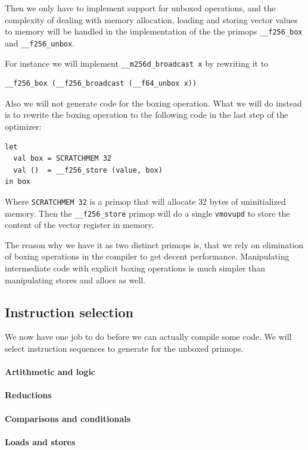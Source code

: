 \documentclass{article}
\begin{document}
Then we only have to implement support for unboxed operations, and the complexity of dealing with memory allocation, loading and storing vector values to memory will be handled in the implementation of the the primops \verb!__f256_box! and \verb!__f256_unbox!.

For instance we will implement \verb!__m256d_broadcast x! by rewriting it to
\begin{verbatim}
__f256_box (__f256_broadcast (__f64_unbox x))
\end{verbatim}

Also we will not generate code for the boxing operation. What we will do instead is to rewrite the boxing operation to the following code in the last step of the optimizer:
\begin{lstlisting}
let
  val box = SCRATCHMEM 32
  val ()  = __f256_store (value, box)
in box
\end{lstlisting}
Where \verb!SCRATCHMEM 32! is a primop that will allocate 32 bytes of uninitialized memory. Then the \verb!__f256_store! primop will do a single \verb!vmovupd! to store the content of the vector register in memory.

The reason why we have it as two distinct primops is, that we rely on elimination of boxing operations in the compiler to get decent performance. Manipulating intermediate code with explicit boxing operations is much simpler than manipulating stores and allocs as well.

\subsection{Instruction selection}

We now have one job to do before we can actually compile some code. We will select instruction sequences to generate for the unboxed primops.

\paragraph{Artithmetic and logic}
\paragraph{Reductions}
\paragraph{Comparisons and conditionals}
\paragraph{Loads and stores}
\end{document}
